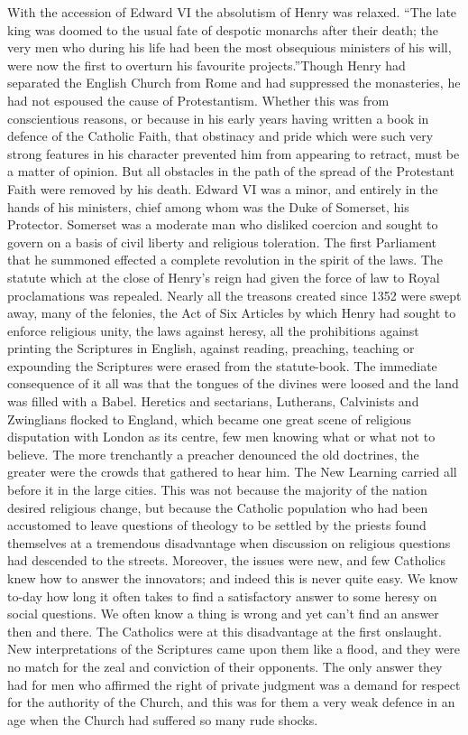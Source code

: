 \documentclass{book}
\begin{document}
With the accession of Edward VI the absolutism of Henry was relaxed. “The late king was doomed to the usual fate of despotic monarchs after their death; the very men who during his life had been the most obsequious ministers of his will, were now the first to overturn his favourite projects.”\footnotemark[2] Though Henry had separated the English Church from Rome and had suppressed the monasteries, he had not espoused the cause of Protestantism. Whether this was from conscientious reasons, or because in his early years having written a book in defence of the Catholic Faith, that obstinacy and pride which were such very strong features in his character prevented him from appearing to retract, must be a matter of opinion. But all obstacles in the path of the spread of the Protestant Faith were removed by his death. Edward VI was a minor, and entirely in the hands of his ministers, chief among whom was the Duke of Somerset, his Protector. Somerset was a moderate man who disliked coercion and sought to govern on a basis of civil liberty and religious toleration. The first Parliament that he summoned effected a complete revolution in the spirit of the laws. The statute which at the close of Henry’s reign had given the force of law to Royal proclamations was repealed. Nearly all the treasons created since 1352 were swept away, many of the felonies, the Act of Six Articles by which Henry had sought to enforce religious unity, the laws against heresy, all the prohibitions against printing the Scriptures in English, against reading, preaching, teaching or expounding the Scriptures were erased from the statute-book. The immediate consequence of it all was that the tongues of the divines were loosed and the land was filled with a Babel. Heretics and sectarians, Lutherans, Calvinists and Zwinglians flocked to England, which became one great scene of religious disputation with London as its centre, few men knowing what or what not to believe. The more trenchantly a preacher denounced the old doctrines, the greater were the crowds that gathered to hear him. The New Learning carried all before it in the large cities. This was not because the majority of the nation desired religious change, but because the Catholic population who had been accustomed to leave questions of theology to be settled by the priests found themselves at a tremendous disadvantage when discussion on religious questions had descended to the streets. Moreover, the issues were new, and few Catholics knew how to answer the innovators; and indeed this is never quite easy. We know to-day how long it often takes to find a satisfactory answer to some heresy on social questions. We often know a thing is wrong and yet can’t find an answer then and there. The Catholics were at this disadvantage at the first onslaught. New interpretations of the Scriptures came upon them like a flood, and they were no match for the zeal and conviction of their opponents. The only answer they had for men who affirmed the right of private judgment was a demand for respect for the authority of the Church, and this was for them a very weak defence in an age when the Church had suffered so many rude shocks.
\end{document}
